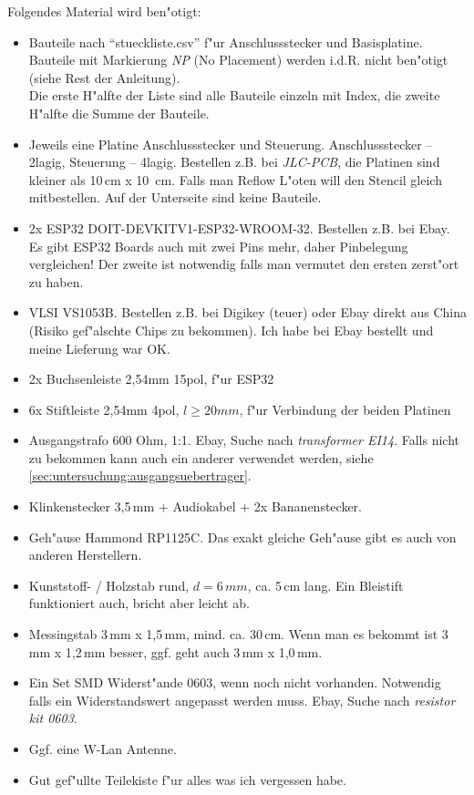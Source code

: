 \documentclass[ngerman,11pt,parskip=half] {scrartcl}
\begin{document}
Folgendes Material wird ben"otigt:
\begin{itemize}
\item Bauteile nach "`stueckliste.csv"' f"ur Anschlussstecker und Basisplatine. Bauteile mit Markierung \emph{NP} (No Placement) werden i.d.R. nicht ben"otigt (siehe Rest der Anleitung).\\
Die erste H"alfte der Liste sind alle Bauteile einzeln mit Index, die zweite H"alfte die Summe der Bauteile.
\item Jeweils eine Platine Anschlussstecker und Steuerung. Anschlussstecker -- 2lagig, Steuerung -- 4lagig. Bestellen z.B. bei \emph{JLC-PCB}, die Platinen sind kleiner als 10\,cm x 10\, cm. Falls man Reflow L"oten will den Stencil gleich mitbestellen. Auf der Unterseite sind keine Bauteile.
\item 2x ESP32 DOIT-DEVKITV1-ESP32-WROOM-32. Bestellen z.B. bei Ebay. Es gibt ESP32 Boards auch mit zwei Pins mehr, daher Pinbelegung vergleichen! Der zweite ist  notwendig falls man vermutet den ersten zerst"ort zu haben.
\item VLSI VS1053B. Bestellen z.B. bei Digikey (teuer) oder Ebay direkt aus China (Risiko gef"alschte Chips zu bekommen). Ich habe bei Ebay bestellt und meine Lieferung war OK.
\item 2x Buchsenleiste 2,54mm 15pol, f"ur ESP32
\item 6x Stiftleiste 2,54mm 4pol, $l \geq 20mm$, f"ur Verbindung der beiden Platinen
\item Ausgangstrafo 600 Ohm, 1:1. Ebay, Suche nach \emph{transformer EI14}. Falls nicht zu bekommen kann auch ein anderer verwendet werden, siehe  \ref{sec:untersuchung:ausgangsuebertrager}.
\item Klinkenstecker 3,5\,mm + Audiokabel + 2x Bananenstecker.
\item Geh"ause Hammond RP1125C. Das exakt gleiche Geh"ause gibt es auch von anderen Herstellern.
\item Kunststoff- / Holzstab rund, $d=6\,mm$, ca. 5\,cm lang. Ein Bleistift funktioniert auch, bricht aber leicht ab.
\item Messingstab 3\,mm x 1,5\,mm, mind. ca. 30\,cm. Wenn man es bekommt ist 3\,mm x 1,2\,mm besser, ggf. geht auch 3\,mm x 1,0\,mm.
\item Ein Set SMD Widerst"ande 0603, wenn noch nicht vorhanden. Notwendig falls ein Widerstandswert angepasst werden muss. Ebay, Suche nach \emph{resistor kit 0603}.
\item Ggf. eine W-Lan Antenne.
\item Gut gef"ullte Teilekiste f"ur alles was ich vergessen habe.
\end{itemize}
\end{document}
